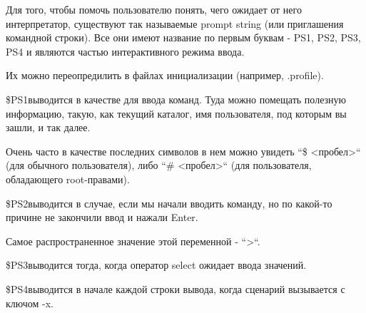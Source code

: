 Для того, чтобы помочь пользователю понять, чего ожидает от него интерпретатор, существуют так называемые prompt string (или приглашения командной строки). Все они имеют название по первым буквам - PS1, PS2, PS3, PS4 и являются частью интерактивного режима ввода.

Их можно переопредилить в файлах инициализации (например, .profile).

\begin{myenv}{\$PS1}{выводится в качестве для ввода команд. Туда можно помещать полезную
информацию, такую, как текущий каталог, имя пользователя, под которым вы зашли, и так
далее.}

Очень часто в качестве последних символов в нем можно увидеть “\$ {<пробел>}“ (для обычного пользователя), либо “\# {<пробел>}“ (для пользователя, обладающего root-правами).
\end{myenv}

\begin{myenv}{\$PS2}{выводится в случае, если мы начали вводить команду, но по какой-то причине не
закончили ввод и нажали Enter.}

Самое распространенное значение этой переменной - “{>}“.
\end{myenv}

\begin{myenv}{\$PS3}{выводится тогда, когда оператор select ожидает ввода значений.}
\end{myenv}

\begin{myenv}{\$PS4}{выводится в начале каждой строки вывода, когда сценарий вызывается с ключом -x.}
\end{myenv}